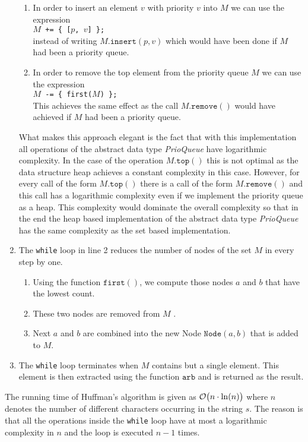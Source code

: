 \begin{enumerate}
\begin{enumerate}
      \item In order to insert an element $v$ with priority $v$ into $M$ we can use the expression
            \\[0.2cm]
            \hspace*{1.3cm}
            \texttt{$M$ += \{ [$p$, $v$] \};}
            \\[0.2cm]
            instead of writing $M.\mathtt{insert}(p, v)$ which  would have been done if $M$ had been a priority queue.
      \item In order to remove the top element from the priority queue $M$ we can use the expression
            \\[0.2cm]
            \hspace*{1.3cm}
            \texttt{$M$ -= \{ \texttt{first}($M$) \};}
            \\[0.2cm]
            This achieves the same effect as the call $M.\mathtt{remove}()$ would have achieved if $M$ had been
            a priority queue.
      \end{enumerate}
      What makes this approach elegant is the fact that with this implementation all operations of the abstract
      data type \textsl{PrioQueue} have logarithmic complexity.  In the case of the operation
      $M.\mathtt{top}()$ this is not optimal as the data structure heap achieves a constant complexity in this case.
      However, for every call of the form  $M.\mathtt{top}()$ there is a call of the form
      $M.\mathtt{remove}()$ and this call has a logarithmic complexity even if we implement the priority queue
      as a heap.   This complexity would dominate the overall complexity so that in the end the heap based
      implementation of the abstract data type \textsl{PrioQueue} has the same complexity as the set based
      implementation. 
\item The \texttt{while} loop in line 2 reduces the number of nodes of the set $M$ in every step by one.
      \begin{enumerate}
      \item Using the function $\mathtt{first}()$, we compute those nodes $a$ and $b$ that have the lowest count.
      \item These two nodes are removed from $M$ .
      \item Next $a$ and $b$ are combined into the new Node $\mathtt{Node}(a,b)$ that is added to $M$.
      \end{enumerate}
\item The \texttt{while} loop terminates when $M$ contains but a single element.  This element
      is then extracted using the function $\mathtt{arb}$ and is returned as the result.
\end{enumerate}
The running time of Huffman's algorithm is given as  $\mathcal{O}\bigl(n \cdot \ln(n)\bigr)$ where $n$ denotes the
number of different characters occurring in the string $s$.  The reason is that all
the operations inside the \texttt{while} loop have at most a logarithmic complexity in $n$ and the loop is
executed $n-1$ times.
 

